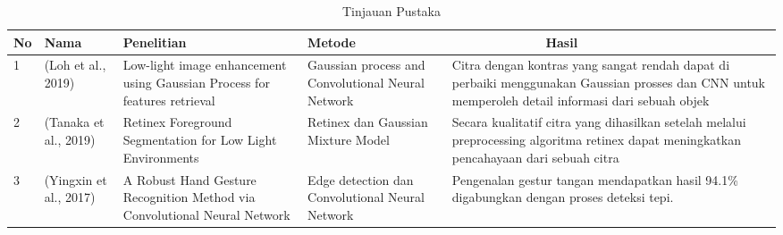 \begin{table}[htbp]
	\caption{Tinjauan Pustaka}
	\label{labelku}
	\vspace{0.2cm}
	
	\begin{tabular}{|p{0.5cm}|p{2cm}|p{3cm}|p{3cm}|p{4cm}|}
		\hline
		No \centering & Nama \centering &\centering  Penelitian & \centering Metode & \ \ \ \ \ \ \ \ \  \ \ \ \ Hasil \\
		
		\hline
		1 & (Loh et al., 2019) & Low-light image enhancement using Gaussian Process for features retrieval & Gaussian process and Convolutional Neural Network & Citra dengan kontras yang sangat rendah dapat di perbaiki menggunakan Gaussian prosses dan CNN untuk memperoleh detail informasi dari sebuah objek \\
		
		\hline
		2 & (Tanaka et al., 2019) & Retinex Foreground Segmentation for Low Light Environments & Retinex dan Gaussian Mixture Model & Secara kualitatif citra yang dihasilkan setelah melalui preprocessing algoritma retinex dapat meningkatkan pencahayaan dari sebuah citra\\
		
		\hline
		3 & (Yingxin et al., 2017) & A Robust Hand Gesture Recognition Method via Convolutional Neural Network & Edge detection dan Convolutional Neural Network & Pengenalan gestur tangan mendapatkan hasil 94.1\% digabungkan dengan proses deteksi tepi.\\
		\hline
	\end{tabular}
\end{table}

